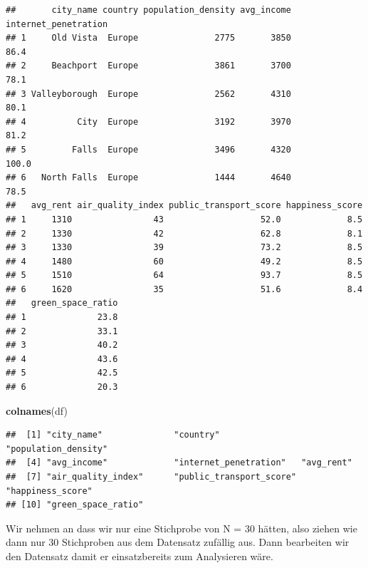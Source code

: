 \documentclass[
]{article}
\newenvironment{Shaded}{\begin{snugshade}}{\end{snugshade}}
\newcommand{\FunctionTok}[1]{\textcolor[rgb]{0.13,0.29,0.53}{\textbf{#1}}}
\newcommand{\NormalTok}[1]{#1}
\begin{document}
\begin{verbatim}
##       city_name country population_density avg_income internet_penetration
## 1     Old Vista  Europe               2775       3850                 86.4
## 2     Beachport  Europe               3861       3700                 78.1
## 3 Valleyborough  Europe               2562       4310                 80.1
## 4          City  Europe               3192       3970                 81.2
## 5         Falls  Europe               3496       4320                100.0
## 6   North Falls  Europe               1444       4640                 78.5
##   avg_rent air_quality_index public_transport_score happiness_score
## 1     1310                43                   52.0             8.5
## 2     1330                42                   62.8             8.1
## 3     1330                39                   73.2             8.5
## 4     1480                60                   49.2             8.5
## 5     1510                64                   93.7             8.5
## 6     1620                35                   51.6             8.4
##   green_space_ratio
## 1              23.8
## 2              33.1
## 3              40.2
## 4              43.6
## 5              42.5
## 6              20.3
\end{verbatim}

\begin{Shaded}
\begin{Highlighting}[]
\FunctionTok{colnames}\NormalTok{(df)}
\end{Highlighting}
\end{Shaded}

\begin{verbatim}
##  [1] "city_name"              "country"                "population_density"    
##  [4] "avg_income"             "internet_penetration"   "avg_rent"              
##  [7] "air_quality_index"      "public_transport_score" "happiness_score"       
## [10] "green_space_ratio"
\end{verbatim}

Wir nehmen an dass wir nur eine Stichprobe von N = 30 hätten, also
ziehen wie dann nur 30 Stichproben aus dem Datensatz zufällig aus. Dann
bearbeiten wir den Datensatz damit er einsatzbereits zum Analysieren
wäre.
\end{document}
